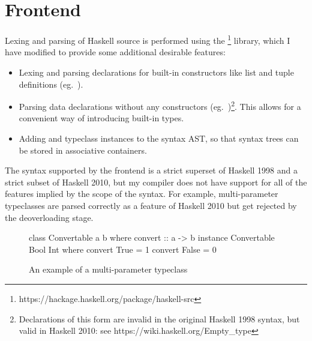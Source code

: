 \documentclass[dissertation.tex]{subfiles}
\begin{document}
\section{Frontend}
{

    Lexing and parsing of Haskell source is performed using the \footnote{https://hackage.haskell.org/package/haskell-src} library, which I have modified to provide some additional desirable features:

    \begin{itemize}
    \item
    {
        Lexing and parsing declarations for built-in constructors like list and tuple definitions (eg.\ ).
    }
    \item
    {

        Parsing data declarations without any constructors (eg.\ )\footnote{Declarations of this form are invalid in the original Haskell 1998 syntax, but valid in Haskell 2010: see https://wiki.haskell.org/Empty\_type}. This allows for a convenient way of introducing built-in types.

    }
    \item
    {

        Adding  and  typeclass instances to the syntax AST, so that syntax trees can be stored in associative containers.

    }
    \end{itemize}

    The syntax supported by the frontend is a strict superset of Haskell 1998 and a strict subset of Haskell 2010, but my compiler does not have support for all of the features implied by the scope of the syntax. For example, multi-parameter typeclasses are parsed correctly as a feature of Haskell 2010 but get rejected by the deoverloading stage.

    \begin{figure}[h]
        \begin{haskellfigure}
        class Convertable a b where
            convert :: a -> b
        instance Convertable Bool Int where
            convert True = 1
            convert False = 0
        \end{haskellfigure}
        \caption{An example of a multi-parameter typeclass}
    \end{figure}

}
\end{document}
